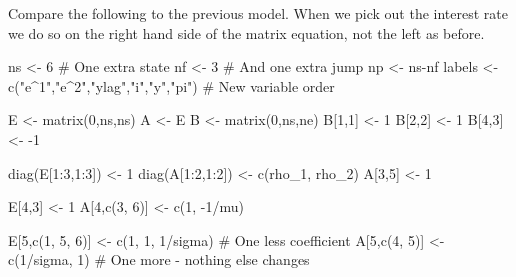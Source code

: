 \documentclass[
  letterpaper,
]{book}
\newenvironment{Shaded}{\begin{snugshade}}{\end{snugshade}}
\newcommand{\CommentTok}[1]{\textcolor[rgb]{0.37,0.37,0.37}{#1}}
\newcommand{\DecValTok}[1]{\textcolor[rgb]{0.68,0.00,0.00}{#1}}
\newcommand{\FunctionTok}[1]{\textcolor[rgb]{0.28,0.35,0.67}{#1}}
\newcommand{\NormalTok}[1]{\textcolor[rgb]{0.00,0.23,0.31}{#1}}
\newcommand{\OtherTok}[1]{\textcolor[rgb]{0.00,0.23,0.31}{#1}}
\newcommand{\SpecialCharTok}[1]{\textcolor[rgb]{0.37,0.37,0.37}{#1}}
\newcommand{\StringTok}[1]{\textcolor[rgb]{0.13,0.47,0.30}{#1}}
\begin{document}
Compare the following to the previous model. When we pick out the
interest rate we do so on the right hand side of the matrix equation,
not the left as before.

\begin{Shaded}
\begin{Highlighting}[]
\NormalTok{ns }\OtherTok{\textless{}{-}} \DecValTok{6}      \CommentTok{\# One extra state}
\NormalTok{nf }\OtherTok{\textless{}{-}} \DecValTok{3}      \CommentTok{\# And one extra jump}
\NormalTok{np }\OtherTok{\textless{}{-}}\NormalTok{ ns}\SpecialCharTok{{-}}\NormalTok{nf}
\NormalTok{labels }\OtherTok{\textless{}{-}} \FunctionTok{c}\NormalTok{(}\StringTok{"e\^{}1"}\NormalTok{,}\StringTok{"e\^{}2"}\NormalTok{,}\StringTok{"ylag"}\NormalTok{,}\StringTok{"i"}\NormalTok{,}\StringTok{"y"}\NormalTok{,}\StringTok{"pi"}\NormalTok{) }\CommentTok{\# New variable order}

\NormalTok{E }\OtherTok{\textless{}{-}} \FunctionTok{matrix}\NormalTok{(}\DecValTok{0}\NormalTok{,ns,ns)}
\NormalTok{A }\OtherTok{\textless{}{-}}\NormalTok{ E}
\NormalTok{B }\OtherTok{\textless{}{-}} \FunctionTok{matrix}\NormalTok{(}\DecValTok{0}\NormalTok{,ns,ne)}
\NormalTok{B[}\DecValTok{1}\NormalTok{,}\DecValTok{1}\NormalTok{] }\OtherTok{\textless{}{-}} \DecValTok{1}
\NormalTok{B[}\DecValTok{2}\NormalTok{,}\DecValTok{2}\NormalTok{] }\OtherTok{\textless{}{-}} \DecValTok{1}
\NormalTok{B[}\DecValTok{4}\NormalTok{,}\DecValTok{3}\NormalTok{] }\OtherTok{\textless{}{-}} \SpecialCharTok{{-}}\DecValTok{1}

\FunctionTok{diag}\NormalTok{(E[}\DecValTok{1}\SpecialCharTok{:}\DecValTok{3}\NormalTok{,}\DecValTok{1}\SpecialCharTok{:}\DecValTok{3}\NormalTok{]) }\OtherTok{\textless{}{-}} \DecValTok{1}
\FunctionTok{diag}\NormalTok{(A[}\DecValTok{1}\SpecialCharTok{:}\DecValTok{2}\NormalTok{,}\DecValTok{1}\SpecialCharTok{:}\DecValTok{2}\NormalTok{]) }\OtherTok{\textless{}{-}} \FunctionTok{c}\NormalTok{(rho\_1, rho\_2)}
\NormalTok{A[}\DecValTok{3}\NormalTok{,}\DecValTok{5}\NormalTok{]           }\OtherTok{\textless{}{-}} \DecValTok{1}

\NormalTok{E[}\DecValTok{4}\NormalTok{,}\DecValTok{3}\NormalTok{]           }\OtherTok{\textless{}{-}} \DecValTok{1}
\NormalTok{A[}\DecValTok{4}\NormalTok{,}\FunctionTok{c}\NormalTok{(}\DecValTok{3}\NormalTok{, }\DecValTok{6}\NormalTok{)]     }\OtherTok{\textless{}{-}} \FunctionTok{c}\NormalTok{(}\DecValTok{1}\NormalTok{, }\SpecialCharTok{{-}}\DecValTok{1}\SpecialCharTok{/}\NormalTok{mu)}

\NormalTok{E[}\DecValTok{5}\NormalTok{,}\FunctionTok{c}\NormalTok{(}\DecValTok{1}\NormalTok{, }\DecValTok{5}\NormalTok{, }\DecValTok{6}\NormalTok{)]  }\OtherTok{\textless{}{-}} \FunctionTok{c}\NormalTok{(}\DecValTok{1}\NormalTok{, }\DecValTok{1}\NormalTok{, }\DecValTok{1}\SpecialCharTok{/}\NormalTok{sigma) }\CommentTok{\# One less coefficient}
\NormalTok{A[}\DecValTok{5}\NormalTok{,}\FunctionTok{c}\NormalTok{(}\DecValTok{4}\NormalTok{, }\DecValTok{5}\NormalTok{)]     }\OtherTok{\textless{}{-}} \FunctionTok{c}\NormalTok{(}\DecValTok{1}\SpecialCharTok{/}\NormalTok{sigma, }\DecValTok{1}\NormalTok{)    }\CommentTok{\# One more {-} nothing else changes}


\end{Highlighting}
\end{Shaded}
\end{document}
